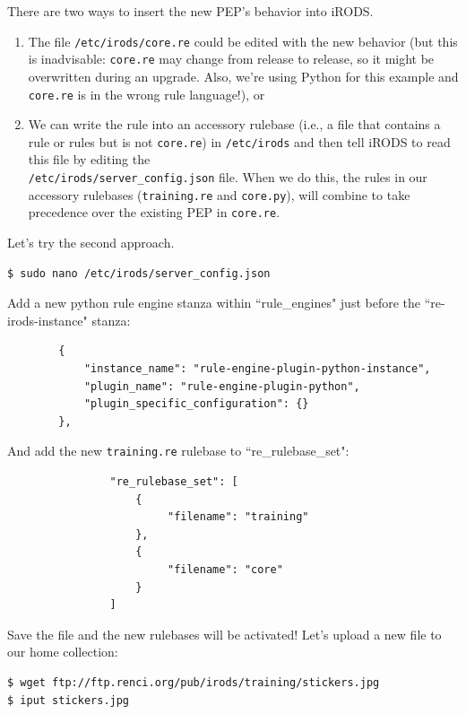 \documentclass[10pt,oneside]{memoir}
\begin{document}
There are two ways to insert the new PEP's behavior into iRODS.
\begin{enumerate}
 \item The file \texttt{/etc/irods/core.re} could be edited with the new behavior (but this is inadvisable: \texttt{core.re} may change from release to release, so it might be overwritten during an upgrade.  Also, we're using Python for this example and \texttt{core.re} is in the wrong rule language!), or
 \item We can write the rule into an accessory rulebase (i.e., a file that contains a rule or rules but is not \texttt{core.re}) in \texttt{/etc/irods} and then tell iRODS to read this file by editing the \\ \texttt{/etc/irods/server\_config.json} file. When we do this, the rules in our accessory rulebases (\texttt{training.re} and \texttt{core.py}), will combine to take precedence over the existing PEP in \texttt{core.re}.
\end{enumerate}

Let's try the second approach.

\begin{lstlisting}
$ sudo nano /etc/irods/server_config.json
\end{lstlisting}

Add a new python rule engine stanza within ``rule\_engines" just before the ``re-irods-instance" stanza:

\begin{lstlisting}
        {
            "instance_name": "rule-engine-plugin-python-instance",
            "plugin_name": "rule-engine-plugin-python",
            "plugin_specific_configuration": {}
        },
\end{lstlisting}

And add the new \texttt{training.re} rulebase to ``re\_rulebase\_set":

\begin{lstlisting}
                "re_rulebase_set": [
                    {
                         "filename": "training"
                    },
                    {
                         "filename": "core"
                    }
                ]
\end{lstlisting}

Save the file and the new rulebases will be activated!  Let's upload a new file to our home collection:

\begin{lstlisting}
$ wget ftp://ftp.renci.org/pub/irods/training/stickers.jpg
$ iput stickers.jpg
\end{lstlisting}
\end{document}
